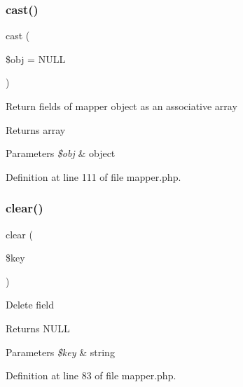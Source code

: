 \subsubsection{\texorpdfstring{cast()}{cast()}}
{\footnotesize\ttfamily cast (\begin{DoxyParamCaption}\item[{}]{\$obj = {\ttfamily NULL} }\end{DoxyParamCaption})}

Return fields of mapper object as an associative array \begin{DoxyReturn}{Returns}
array 
\end{DoxyReturn}

\begin{DoxyParams}{Parameters}
{\em \$obj} & object \\
\hline
\end{DoxyParams}


Definition at line 111 of file mapper.\+php.

\hypertarget{class_d_b_1_1_jig_1_1_mapper_a10a949ef75de6c82c98ac555f371ba83}{}\label{class_d_b_1_1_jig_1_1_mapper_a10a949ef75de6c82c98ac555f371ba83} 
\subsubsection{\texorpdfstring{clear()}{clear()}}
{\footnotesize\ttfamily clear (\begin{DoxyParamCaption}\item[{}]{\$key }\end{DoxyParamCaption})}

Delete field \begin{DoxyReturn}{Returns}
N\+U\+LL 
\end{DoxyReturn}

\begin{DoxyParams}{Parameters}
{\em \$key} & string \\
\hline
\end{DoxyParams}


Definition at line 83 of file mapper.\+php.

\hypertarget{class_d_b_1_1_jig_1_1_mapper_adffe904ab38af888d9b033647ec6d935}{}\label{class_d_b_1_1_jig_1_1_mapper_adffe904ab38af888d9b033647ec6d935} 
